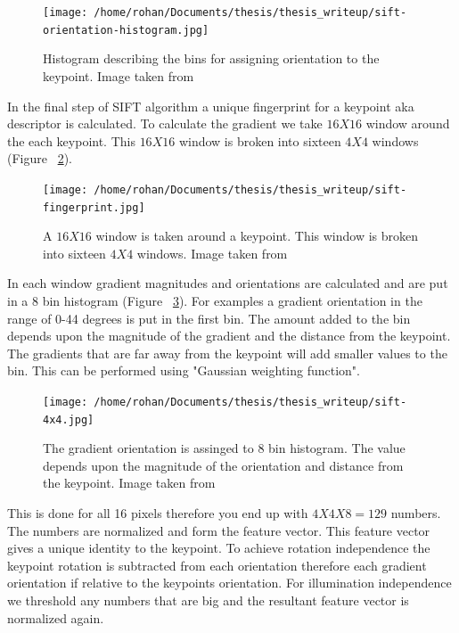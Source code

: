 \documentclass[12pt]{dalcsthesis}
\begin{document}
\begin{figure}
  \centering
     {\texttt{[image: /home/rohan/Documents/thesis/thesis\_writeup/sift-orientation-histogram.jpg]}}
  \caption{\label{fig- sift bin histogram} Histogram describing the bins for assigning orientation to the keypoint. Image taken from \cite{sift_url}}
\end{figure}

In the final step of SIFT algorithm a unique fingerprint for a keypoint aka descriptor is calculated. To calculate the gradient we take $16 X 16$ window around the each keypoint. This $16 X 16$ window is broken into sixteen $4 X4$ windows (Figure ~\ref{fig- sift bin fingerprint}).

\begin{figure}
  \centering
     {\texttt{[image: /home/rohan/Documents/thesis/thesis\_writeup/sift-fingerprint.jpg]}}
  \caption{\label{fig- sift bin fingerprint} A $16 X16$ window is taken around a keypoint. This window is broken into sixteen $4 X 4$ windows. Image taken from \cite{sift_url}}
\end{figure}

In each window gradient magnitudes and orientations are calculated and are put in a 8 bin histogram (Figure ~\ref{fig- sift bin histogram gradient}). For examples a gradient orientation in the range of 0-44 degrees is put in the first bin. The amount added to the bin depends upon the magnitude of the gradient and the distance from the keypoint. The gradients that are far away from the keypoint will add smaller values to the bin. This can be performed using "Gaussian weighting function". 

\begin{figure}
  \centering
     {\texttt{[image: /home/rohan/Documents/thesis/thesis\_writeup/sift-4x4.jpg]}}
  \caption{\label{fig- sift bin histogram gradient} The gradient orientation is assinged to 8 bin histogram. The value depends upon the magnitude of the orientation and distance from the keypoint. Image taken from \cite{sift_url}}
\end{figure}

This is done for all 16 pixels therefore you end up with $4X4X8=129$ numbers. The numbers are normalized and form the feature vector. This feature vector gives a unique identity to the keypoint. To achieve rotation independence the keypoint rotation is subtracted from each orientation therefore each gradient orientation if relative to the keypoints orientation. For illumination independence we threshold any numbers that are big and the resultant feature vector is normalized again. 
\end{document}
